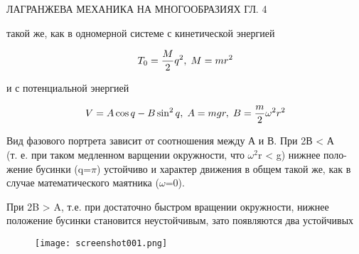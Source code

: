\documentclass[10pt]{article}
\begin{document}
		\footnotesize	

		 ЛАГРАНЖЕВА МЕХАНИКА НА МНОГООБРАЗИЯХ ГЛ. 4 

		\noindent
		такой же, как в одномерной системе с кинетической энергией


		\footnotesize	

		\begin{equation*}
			T_0 = \frac{M}{2} q^2 , \hspace{1mm} M=mr^2
		\end{equation*}
		
		\noindent
		и с потенциальной энергией

		\begin{equation*} 
			V = A \cos{q} - B \sin^2{q}, 
			\hspace{1mm} A=mgr, 
			\hspace{1mm} B=\frac{m}{2} \omega^2 r^2
		\end{equation*}
		
		\noindent
		Вид фазового портрета зависит \hspace{0.6mm} от \hspace{0.6mm} соотношения между А и В. При 2В < А \\
		(т. е. при таком медленном варщении окружности, что $\omega^2$r < g) нижнее поло-\\
		жение бусинки (q=$\pi$) устойчиво и характер движения в общем такой же, как
		в случае математического маятника ($\omega$=0). 
		\par
		При 2B > A, т.е.  при достаточно быстром вращении окружности, нижнее
		положение бусинки становится неустойчивым, зато появляются два устойчивых
		
		\begin{figure}
			\texttt{[image: screenshot001.png]}
		\end{figure}
\end{document}

